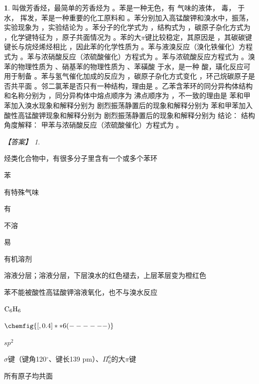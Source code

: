 \documentclass[UTF8, 10pt, a4paper, oneside]{ctexart}
\newcommand{\blank}{ \underbar{\quad$\blacktriangle$\quad} }%
\theoremstyle{definition}
\newtheorem{subexercise}{}[exercise]%
\theoremstyle{remark}
\newtheorem*{answer}{【答案】}
\theoremstyle{plain}
\begin{document}
\begin{subexercise}

    \blank 叫做芳香烃，最简单的芳香烃为\blank 。苯是一种无色，有\blank 气味的液体，\blank 毒，\blank 于水，\blank 挥发，苯是一种重要的化工原料和\blank 。苯分别加入高锰酸钾和溴水中，振荡，实验现象为\blank ，实验结论为\blank 。苯分子的化学式为\blank ，结构式为\blank ，碳原子杂化方式为\blank ，化学键特征为\blank ，原子共面情况为\blank 。苯的大$\pi$键比较稳定，其原因是\blank ，其碳碳键键长与烷烃烯烃相比\blank ，因此苯的化学性质为\blank 。苯与液溴反应（溴化铁催化）方程式为\blank 。苯与浓硝酸反应（浓硫酸催化）方程式为\blank 。苯与浓硫酸反应方程式为\blank 。溴苯的物理性质为\blank 、硝基苯的物理性质为\blank 、苯磺酸\blank 于水，是一种\blank 酸，璜化反应可用于制备\blank 。苯与氢气催化加成的反应为\blank ，碳原子杂化方式变化\blank ，环己烷碳原子是否共平面\blank 。邻二氯苯是否只有一种结构，理由是\blank 。乙苯含苯环的同分异构体结构和名称分别为\blank ，同分异构体中熔点顺序为\blank 沸点顺序为\blank ，不一致的理由是\blank 苯和甲苯加入溴水现象和解释分别为\blank 剧烈振荡静置后的现象和解释分别为\blank 苯和甲苯加入酸性高锰酸钾现象和解释分别为\blank 剧烈振荡静置后的现象和解释分别为\blank 结论：\blank 结构角度解释：\blank 甲苯与浓硝酸反应（浓硫酸催化）方程式为\blank 。
    \begin{answer}
        \begin{inparaenum}
            \item[\setcounter{enumi}{1}\textsuperscript{\arabic{enumi}}] 烃类化合物中，有很多分子里含有一个或多个苯环
            \item 苯
            \item 有特殊气味
            \item 有
            \item 不溶
            \item 易
            \item 有机溶剂
            \item 溶液分层；溶液分层，下层溴水的红色褪去，上层苯层变为橙红色\vspace{0.5em}
            \item 苯不能被酸性高锰酸钾溶液氧化，也不与溴水反应
            \item $\ce{C6H6}$
            \item $\chemfig{[,0.4] **6(------)}$
            \item $sp^2$
            \item $\sigma$键（键角120$^\circ$、键长139 pm）、$\Pi_6^6$的大$\pi$键
            \item 所有原子均共面

\end{inparaenum}
\end{answer}
\end{subexercise}
\end{document}
